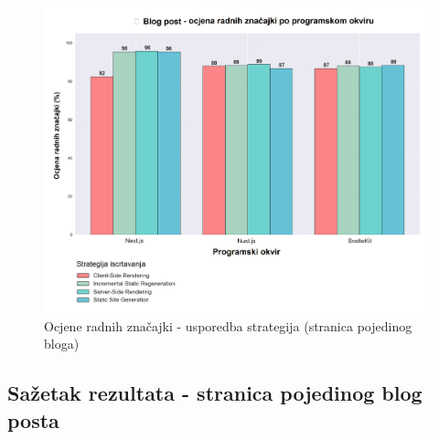 \begin{figure}[H]
    \centering
    \includegraphics[width=\textwidth]{slike/rezultati/blog-post/blogPost_strategy_comparison.png}
    \caption{Ocjene radnih značajki - usporedba strategija (stranica pojedinog bloga) }
    \label{fig:testiranje-blog-post-usporedba-strategija}
\end{figure}

\newpage

\subsection{Sažetak rezultata - stranica pojedinog blog posta}

